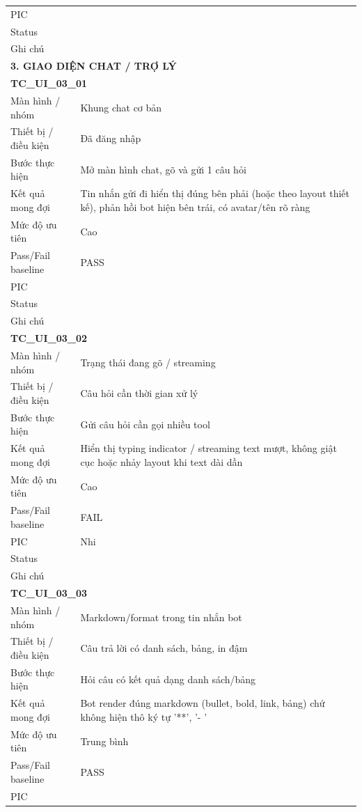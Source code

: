 \documentclass[12pt,a4paper]{article}
\begin{document}
\begin{longtable}{p{3.0cm}p{11.5cm}}
PIC &  \\
Status &  \\
Ghi chú &  \\
\midrule
\multicolumn{2}{l}{\textbf{3. GIAO DIỆN CHAT / TRỢ LÝ}} \\ \midrule
\multicolumn{2}{l}{\textbf{TC\_UI\_03\_01}} \\
Màn hình / nhóm & Khung chat cơ bản \\
Thiết bị / điều kiện & Đã đăng nhập \\
Bước thực hiện & Mở màn hình chat, gõ và gửi 1 câu hỏi \\
Kết quả mong đợi & Tin nhắn gửi đi hiển thị đúng bên phải (hoặc theo layout thiết kế), phản hồi bot hiện bên trái, có avatar/tên rõ ràng \\
Mức độ ưu tiên & Cao \\
Pass/Fail baseline & PASS \\
PIC &  \\
Status &  \\
Ghi chú &  \\
\midrule
\multicolumn{2}{l}{\textbf{TC\_UI\_03\_02}} \\
Màn hình / nhóm & Trạng thái đang gõ / streaming \\
Thiết bị / điều kiện & Câu hỏi cần thời gian xử lý \\
Bước thực hiện & Gửi câu hỏi cần gọi nhiều tool \\
Kết quả mong đợi & Hiển thị typing indicator / streaming text mượt, không giật cục hoặc nhảy layout khi text dài dần \\
Mức độ ưu tiên & Cao \\
Pass/Fail baseline & FAIL \\
PIC & Nhi \\
Status &  \\
Ghi chú &  \\
\midrule
\multicolumn{2}{l}{\textbf{TC\_UI\_03\_03}} \\
Màn hình / nhóm & Markdown/format trong tin nhắn bot \\
Thiết bị / điều kiện & Câu trả lời có danh sách, bảng, in đậm \\
Bước thực hiện & Hỏi câu có kết quả dạng danh sách/bảng \\
Kết quả mong đợi & Bot render đúng markdown (bullet, bold, link, bảng) chứ không hiện thô ký tự '**', '- ' \\
Mức độ ưu tiên & Trung bình \\
Pass/Fail baseline & PASS \\
PIC &  \\

\end{longtable}
\end{document}
